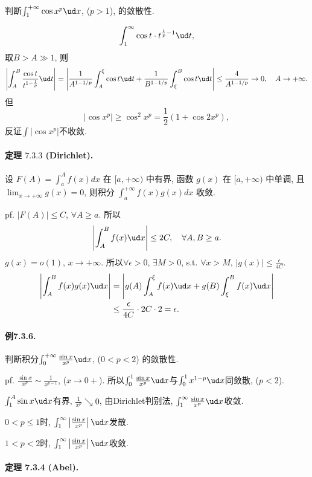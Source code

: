 判断$\int_{1}^{+\infty}\cos x^{p}\ud x$, ($p>1$), 的敛散性.

\[
\int_{1}^{\infty}\cos t\cdot t^{\frac{1}{p}-1}\ud t,
\]
取$B>A\gg1$, 则
\[
\left|\int_{A}^{B}\frac{\cos t}{t^{1-\frac{1}{p}}}\ud t\right|=\left|\frac{1}{A^{1-1/p}}\int_{A}^{\xi}\cos t\ud t+\frac{1}{B^{1-1/p}}\int_{\xi}^{B}\cos t\ud t\right|\le\frac{4}{A^{1-1/p}}\to0,\quad A\to+\infty.
\]
但
\[
\left|\cos x^{p}\right|\ge\cos^{2}x^{p}=\frac{1}{2}\left(1+\cos2x^{p}\right),
\]
反证$\int\left|\cos x^{p}\right|$不收敛.

\paragraph{定理 $7.3.3$ (Dirichlet). }

设 $F(A)=\int_{a}^{A}f(x)dx$ 在 $[a,+\infty)$ 中有界, 函数 $g(x)$ 在 $[a,+\infty)$
中单调, 且 $\lim_{x\rightarrow+\infty}g(x)=0$, 则积分 $\int_{a}^{+\infty}f(x)g(x)dx$
收敛.

pf. $\left|F(A)\right|\le C$, $\forall A\ge a$. 所以
\[
\left|\int_{A}^{B}f(x)\ud x\right|\le2C,\quad\forall A,B\ge a.
\]
$g(x)=o(1)$, $x\to+\infty$. 所以$\forall\epsilon>0$, $\exists M>0$,
s.t. $\forall x>M$, $\left|g(x)\right|\le\frac{\epsilon}{4C}$.
\begin{align*}
\left|\int_{A}^{B}f(x)g(x)\ud x\right| & =\left|g(A)\int_{A}^{\xi}f(x)\ud x+g(B)\int_{\xi}^{B}f(x)\ud x\right|\\
 & \le\frac{\epsilon}{4C}\cdot2C\cdot2=\epsilon.
\end{align*}


\paragraph{例7.3.6.}

判断积分$\int_{0}^{+\infty}\frac{\sin x}{x^{p}}\ud x$, ($0<p<2$) 的敛散性.

pf. $\frac{\sin x}{x^{p}}\sim\frac{1}{x^{p-1}}$, ($x\to0+$). 所以$\int_{0}^{1}\frac{\sin x}{x^{p}}\ud x$与$\int_{0}^{1}x^{1-p}\ud x$同敛散,
($p<2$).

$\int_{1}^{A}\sin x\ud x$有界, $\frac{1}{x^{p}}\searrow0$, 由Dirichlet判别法,
$\int_{1}^{\infty}\frac{\sin x}{x^{p}}\ud x$收敛.

$0<p\le1$时, $\int_{1}^{\infty}\left|\frac{\sin x}{x^{p}}\right|\ud x$发散.

$1<p<2$时, $\int_{1}^{\infty}\left|\frac{\sin x}{x^{p}}\right|\ud x$收敛.

\paragraph{定理 7.3.4 (Abel). }

